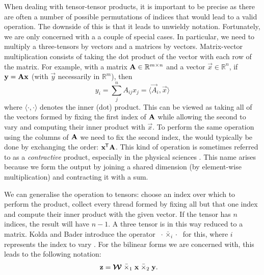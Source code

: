 When dealing with tensor-tensor products, it is important to be precise as there are often
a number of possible permutations of indices that would lead to a valid operation. The downside of
this is that it leads to unwieldy notation. Fortunately, we are only concerned with a a couple of
special cases. In particular, we need to multiply a three-tensors by vectors and a matrices by
vectors. Matrix-vector multiplication consists of taking the dot product of the vector with
each row of the matrix. For example, with a matrix \(\mathbf{A} \in \mathbb{R}^{m \times n}\) and a
vector \(\vec{x} \in \mathbb{R}^n\), if \(\mathbf{y} = \mathbf{A}\mathbf{x}\) (with \(\vec{y}\) necessarily
in \(\mathbb{R}^m\)), then
\begin{equation}\label{eq:matmul}
	y_i = \sum_j^n A_{ij} x_j
		= \langle \vec{A}_i, \vec{x}\rangle
\end{equation} where \(\langle \cdot, \cdot \rangle\) denotes the inner (dot) product. This can be viewed
as taking all of the vectors formed by fixing the first index of \(\mathbf{A}\) while allowing the second
to vary and computing their inner product with \(\vec{x}\). To perform the same operation using the
columns of \(\mathbf{A}\) we need to fix the second index, the would typically be done by exchanging the
order: \(\mathbf{x}^{\mkern-1.5mu\mathsf{T}}\mathbf{A}\). This kind of operation is sometimes referred to as a
\emph{contractive} product, especially in the physical sciences \autocite{Orus2014}. This name
arises because we form the output by joining a shared dimension (by element-wise multiplication) and
contracting it with a sum.

We can generalise the operation to tensors: choose an index over which to perform the product,
collect every thread formed by fixing all but that one index and compute their inner product with the
given vector. If the tensor has \(n\) indices, the result will have \(n-1\). A three tensor is in
this way reduced to a matrix. Kolda and Bader introduce the operator
 \(\;\cdot \bar{\times}_i \cdot\;\)
for this, where \(i\) represents the index to vary \autocite{Kolda2009}. For the bilinear forms
we are concerned with, this leads to the following notation:
\begin{align}
	\mathbf{z} &= \bm{\mathcal{W}} \;\bar{\times}_1\; \mathbf{x}\; \bar{\times}_2\; \mathbf{y} .
	\label{eq:bilinearkolda}
\end{align}

